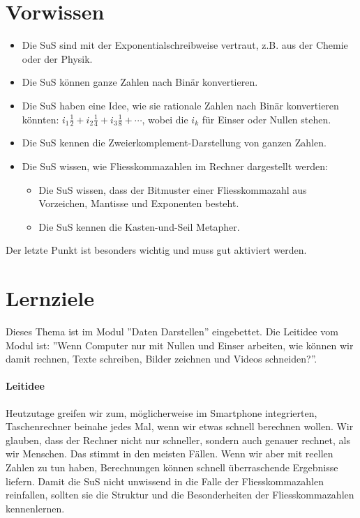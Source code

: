 \documentclass{article}
\begin{document}
\section*{Vorwissen}
\begin{itemize}
\item Die SuS sind mit der Exponentialschreibweise vertraut, z.B. aus der Chemie oder der Physik.
\item Die SuS können ganze Zahlen nach Binär konvertieren.
\item Die SuS haben eine Idee, wie sie rationale Zahlen nach Binär konvertieren könnten: \(i_1 \frac{1}{2} + i_2 \frac{1}{4} + i_3 \frac{1}{8} + \cdots\), wobei die \(i_k\) für Einser oder Nullen stehen. 
\item Die SuS kennen die Zweierkomplement-Darstellung von ganzen Zahlen.
\item Die SuS wissen, wie Fliesskommazahlen im Rechner dargestellt werden:
\begin{itemize}
\item Die SuS wissen, dass der Bitmuster einer Fliesskommazahl aus Vorzeichen, Mantisse und Exponenten besteht.
\item Die SuS kennen die Kasten-und-Seil Metapher.
\end{itemize}
\end{itemize}
Der letzte Punkt ist besonders wichtig und muss gut aktiviert werden.

\section*{Lernziele}

Dieses Thema ist im Modul ''Daten Darstellen'' eingebettet. Die Leitidee vom Modul ist: ''Wenn Computer nur mit Nullen und Einser arbeiten, wie können wir damit rechnen, Texte schreiben, Bilder zeichnen und Videos schneiden?''.

\paragraph{Leitidee} Heutzutage greifen wir zum, möglicherweise im Smartphone integrierten, Taschenrechner beinahe jedes Mal, wenn wir etwas schnell berechnen wollen. Wir glauben, dass der Rechner nicht nur schneller, sondern auch genauer rechnet, als wir Menschen. Das stimmt in den meisten Fällen. Wenn wir aber mit reellen Zahlen zu tun haben, Berechnungen können schnell überraschende Ergebnisse liefern. Damit die SuS nicht unwissend in die Falle der Fliesskommazahlen reinfallen, sollten sie die Struktur und die Besonderheiten der Fliesskommazahlen kennenlernen.
\end{document}
